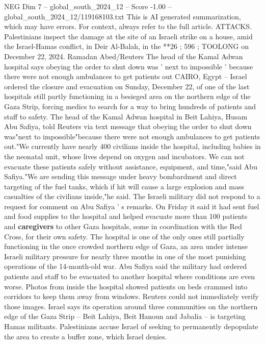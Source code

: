 \begin{textsample}{NEG Dim 7 – global\_south\_2024\_12 – Score -1.00 – global\_south\_2024\_12/119168103.txt}  \label{ex:f7_neg_102}
This is AI generated summarization, which may have errors.
For context, always refer to the full article.
ATTACKS.
Palestinians inspect the damage at the site of an Israeli strike on a house, amid the Israel-Hamas conflict, in Deir Al-Balah, in the **26 ; 596 ; TOOLONG on December 22, 2024.
Ramadan Abed/Reuters The head of the Kamal Adwan hospital says obeying the order to shut down was ' next to impossible ' because there were not enough ambulances to get patients out CAIRO, Egypt -- Israel ordered the closure and evacuation on Sunday, December 22, of one of the last hospitals still partly functioning in a besieged area on the northern edge of the Gaza Strip, forcing medics to search for a way to bring hundreds of patients and staff to safety.
The head of the Kamal Adwan hospital in Beit Lahiya, Husam Abu Safiya, told Reuters via text message that obeying the order to shut down was"next to impossible"because there were not enough ambulances to get patients out."We currently have nearly 400 civilians inside the hospital, including babies in the neonatal unit, whose lives depend on oxygen and incubators.
We can not evacuate these patients safely without assistance, equipment, and time,"said Abu Safiya."We are sending this message under heavy bombardment and direct targeting of the fuel tanks, which if hit will cause a large explosion and mass casualties of the civilians inside,"he said.
The Israeli military did not respond to a request for comment on Abu Safiya ' s remarks.
On Friday it said it had sent fuel and food supplies to the hospital and helped evacuate more than 100 patients and \textbf{caregivers} to other Gaza hospitals, some in coordination with the Red Cross, for their own safety.
The hospital is one of the only ones still partially functioning in the once crowded northern edge of Gaza, an area under intense Israeli military pressure for nearly three months in one of the most punishing operations of the 14-month-old war.
Abu Safiya said the military had ordered patients and staff to be evacuated to another hospital where conditions are even worse.
Photos from inside the hospital showed patients on beds crammed into corridors to keep them away from windows.
Reuters could not immediately verify those images.
Israel says its operation around three communities on the northern edge of the Gaza Strip -- Beit Lahiya, Beit Hanoun and Jabalia -- is targeting Hamas militants.
Palestinians accuse Israel of seeking to permanently depopulate the area to create a buffer zone, which Israel denies.

\end{textsample}
